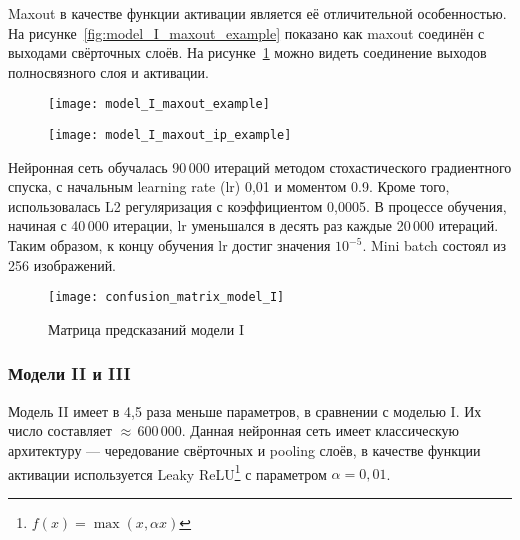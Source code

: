Maxout в качестве функции активации является её отличительной особенностью.
На рисунке~\ref{fig:model_I_maxout_example} показано как maxout соединён с выходами свёрточных слоёв. На
рисунке~\ref{fig:model_I_maxout_ip_example} можно видеть соединение выходов полносвязного слоя и активации.

\begin{figure}[H]
\centering
\begin{minipage}{.5\textwidth}
  \centering
  \texttt{[image: model\_I\_maxout\_example]}
  \label{fig:model_I_maxout_example}
\end{minipage}%
\begin{minipage}{.5\textwidth}
  \centering
  \texttt{[image: model\_I\_maxout\_ip\_example]}
  \label{fig:model_I_maxout_ip_example}
  \vspace*{1.4cm}
\end{minipage}
\vspace*{-1.4cm}
\end{figure}

Нейронная сеть обучалась 90\,000 итераций методом стохастического градиентного спуска,
с начальным learning rate (lr) 0,01 и моментом 0.9. Кроме того, использовалась L2 регуляризация с коэффициентом 0,0005.
В процессе обучения, начиная с 40\,000 итерации, lr уменьшался в десять раз каждые 20\,000 итераций.
Таким образом, к концу обучения lr достиг значения $10^{-5}$. Mini batch состоял из 256 изображений.

\begin{figure}[H]
    \centering
    \texttt{[image: confusion\_matrix\_model\_I]}
    \vspace*{-1cm}
    \caption{Матрица предсказаний модели I}
    \label{fig:confusion_matrix_model_I}
\end{figure}

\subsubsection{Модели II и III}
Модель II имеет в 4,5 раза меньше параметров, в сравнении с моделью I. Их число составляет $\approx$\,600\,000.
Данная нейронная сеть имеет классическую архитектуру --- чередование свёрточных и pooling слоёв, в качестве
функции активации используется Leaky ReLU\footnote{$f(x) = \max(x, \alpha x)$} с параметром $\alpha = 0,01$.

